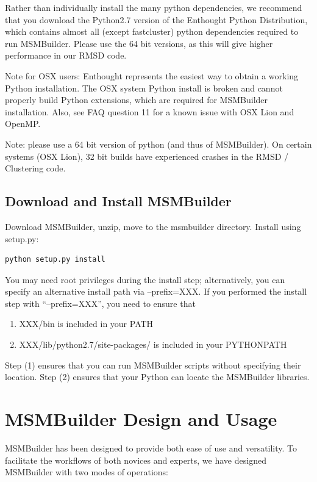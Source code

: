 \documentclass[12pt]{article}
\begin{document}
Rather than individually install the many python dependencies, we recommend that you download the Python2.7 version of the Enthought Python Distribution, which contains almost all (except fastcluster) python dependencies required to run MSMBuilder.  Please use the 64 bit versions, as this will give higher performance in our RMSD code.

Note for OSX users: Enthought represents the easiest way to obtain a working Python installation.  The OSX system Python install is broken and cannot properly build Python extensions, which are required for MSMBuilder installation.  Also, see FAQ question 11 for a known issue with OSX Lion and OpenMP.  

Note: please use a 64 bit version of python (and thus of MSMBuilder).  On certain systems (OSX Lion), 32 bit builds have experienced crashes in the RMSD / Clustering code.

\subsection{Download and Install MSMBuilder}

Download MSMBuilder, unzip, move to the msmbuilder directory.  Install using setup.py:
\begin{verbatim}
python setup.py install
\end{verbatim}

You may need root privileges during the install step; alternatively, you can specify an alternative install path via --prefix=XXX.  If you performed the install step with “--prefix=XXX”, you need to ensure that
\begin{enumerate}
 \item XXX/bin is included in your PATH
 \item XXX/lib/python2.7/site-packages/ is included in your PYTHONPATH
\end{enumerate}


Step (1) ensures that you can run MSMBuilder scripts without specifying their location.  Step (2) ensures that your Python can locate the MSMBuilder libraries.  

\newpage

\section{MSMBuilder Design and Usage}

MSMBuilder has been designed to provide both ease of use and versatility.  To facilitate the workflows of both novices and experts, we have designed MSMBuilder with two modes of operations:
\end{document}
